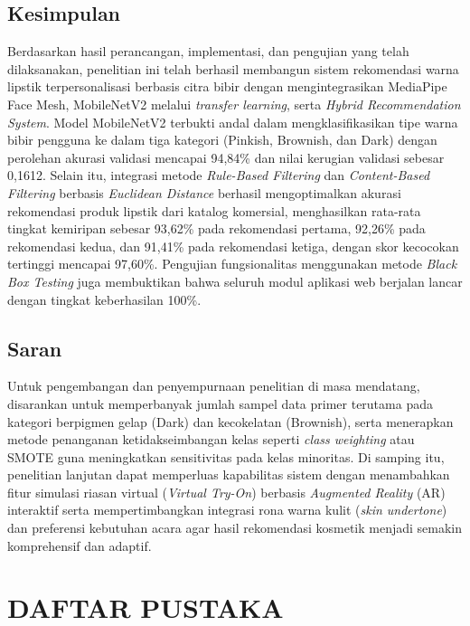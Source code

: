 \documentclass[10pt,a4paper]{article}
\begin{document}
\subsection{Kesimpulan}
Berdasarkan hasil perancangan, implementasi, dan pengujian yang telah dilaksanakan, penelitian ini telah berhasil membangun sistem rekomendasi warna lipstik terpersonalisasi berbasis citra bibir dengan mengintegrasikan MediaPipe Face Mesh, MobileNetV2 melalui \textit{transfer learning}, serta \textit{Hybrid Recommendation System}. Model MobileNetV2 terbukti andal dalam mengklasifikasikan tipe warna bibir pengguna ke dalam tiga kategori (Pinkish, Brownish, dan Dark) dengan perolehan akurasi validasi mencapai 94,84\% dan nilai kerugian validasi sebesar 0,1612. Selain itu, integrasi metode \textit{Rule-Based Filtering} dan \textit{Content-Based Filtering} berbasis \textit{Euclidean Distance} berhasil mengoptimalkan akurasi rekomendasi produk lipstik dari katalog komersial, menghasilkan rata-rata tingkat kemiripan sebesar 93,62\% pada rekomendasi pertama, 92,26\% pada rekomendasi kedua, dan 91,41\% pada rekomendasi ketiga, dengan skor kecocokan tertinggi mencapai 97,60\%. Pengujian fungsionalitas menggunakan metode \textit{Black Box Testing} juga membuktikan bahwa seluruh modul aplikasi web berjalan lancar dengan tingkat keberhasilan 100\%.

\subsection{Saran}
Untuk pengembangan dan penyempurnaan penelitian di masa mendatang, disarankan untuk memperbanyak jumlah sampel data primer terutama pada kategori berpigmen gelap (Dark) dan kecokelatan (Brownish), serta menerapkan metode penanganan ketidakseimbangan kelas seperti \textit{class weighting} atau SMOTE guna meningkatkan sensitivitas pada kelas minoritas. Di samping itu, penelitian lanjutan dapat memperluas kapabilitas sistem dengan menambahkan fitur simulasi riasan virtual (\textit{Virtual Try-On}) berbasis \textit{Augmented Reality} (AR) interaktif serta mempertimbangkan integrasi rona warna kulit (\textit{skin undertone}) dan preferensi kebutuhan acara agar hasil rekomendasi kosmetik menjadi semakin komprehensif dan adaptif.

\section*{DAFTAR PUSTAKA}
\end{document}
